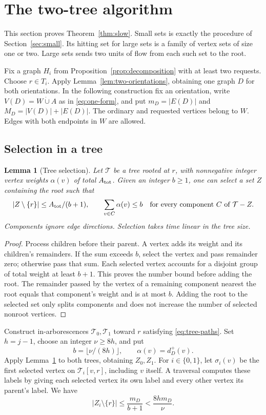 \documentclass[11pt]{article}
\newtheorem{lemma}[theorem]{Lemma}
\theoremstyle{definition}
\theoremstyle{remark}
\begin{document}
\section{The two-tree algorithm}
\label{sec:slow}
This section proves Theorem~\ref{thm:slow}. Small sets is exactly the procedure of Section~\ref{sec:small}. Its hitting set for large sets is a family of vertex sets of size one or two. Large sets sends two units of flow from each such set to the root.

Fix a graph \(H_i\) from Proposition~\ref{prop:decomposition} with at least two requests. Choose \(r\in T_i\). Apply Lemma~\ref{lem:two-orientations}, obtaining one graph \(D\) for both orientations. In the following construction fix an orientation, write \(V(D)=W\dot\cup A\) as in \eqref{eq:one-form}, and put \(m_D=|E(D)|\) and \(M_D=|V(D)|+|E(D)|\). The ordinary and requested vertices belong to \(W\). Edges with both endpoints in \(W\) are allowed.

\subsection{Selection in a tree}
\begin{lemma}[Tree selection]
\label{lem:tree-selection}
Let \(\mathcal T\) be a tree rooted at \(r\), with nonnegative integer vertex weights \(\alpha(v)\) of total \(A_{\rm tot}\). Given an integer \(b\ge1\), one can select a set \(Z\) containing the root such that
\[
 |Z\setminus\{r\}|\le A_{\rm tot}/(b+1),
 \qquad
 \sum_{v\in C}\alpha(v)\le b
 \quad\text{for every component }C\text{ of }\mathcal T-Z.
\]
Components ignore edge directions. Selection takes time linear in the tree size.
\end{lemma}
\begin{proof}
Process children before their parent. A vertex adds its weight and its children's remainders. If the sum exceeds \(b\), select the vertex and pass remainder zero; otherwise pass that sum. Each selected vertex accounts for a disjoint group of total weight at least \(b+1\). This proves the number bound before adding the root. The remainder passed by the vertex of a remaining component nearest the root equals that component's weight and is at most \(b\). Adding the root to the selected set only splits components and does not increase the number of selected nonroot vertices.
\end{proof}

Construct in-arborescences \(\mathcal T_0,\mathcal T_1\) toward \(r\) satisfying \eqref{eq:tree-paths}. Set \(h=j-1\), choose an integer \(\nu\ge8h\), and put
\[
 b=\lfloor\nu/(8h)\rfloor,
 \qquad \alpha(v)=d_D^+(v).
\]
Apply Lemma~\ref{lem:tree-selection} to both trees, obtaining \(Z_0,Z_1\). For \(i\in\{0,1\}\), let \(\sigma_i(v)\) be the first selected vertex on \(\mathcal T_i[v,r]\), including \(v\) itself. A traversal computes these labels by giving each selected vertex its own label and every other vertex its parent's label. We have
\begin{equation}
 |Z_i\setminus\{r\}|\le\frac{m_D}{b+1}<\frac{8h m_D}{\nu}.
 \label{eq:Zi-bound}
\end{equation}
\end{document}
